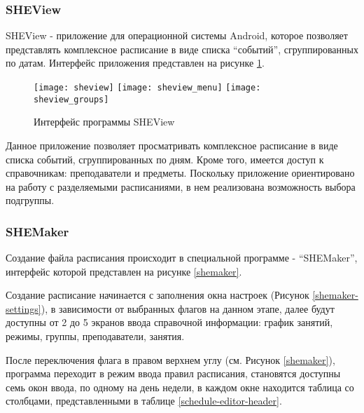 \subsubsection{SHEView}

SHEView - приложение для операционной системы Android, которое позволяет представлять комплексное расписание в виде списка “событий”, сгруппированных по датам.
Интерфейс приложения представлен на рисунке \ref{sheview}.

\begin{figure}[!htb]
      \texttt{[image: sheview]}
  \endminipage\hfill
      \texttt{[image: sheview\_menu]}
  \endminipage\hfill
      \texttt{[image: sheview\_groups]}
  \endminipage
  \caption{Интерфейс программы SHEView} \label{sheview}
\end{figure}

Данное приложение позволяет просматривать комплексное расписание в виде списка событий, сгруппированных по дням.
Кроме того, имеется доступ к справочникам: преподаватели и предметы.
Поскольку приложение ориентировано на работу с разделяемыми расписаниями, в нем реализована возможность выбора подгруппы.

\subsubsection{SHEMaker}

Создание файла расписания происходит в специальной программе - “SHEMaker”, интерфейс которой представлен на рисунке \ref{shemaker}.


Создание расписание начинается с заполнения окна настроек (Рисунок \ref{shemaker-settings}), в зависимости от выбранных флагов на данном этапе, далее будут доступны от 2 до 5 экранов ввода справочной информации: график занятий, режимы, группы, преподаватели, занятия.


После переключения флага в правом верхнем углу (см. Рисунок \ref{shemaker}), программа переходит в режим ввода правил расписания, становятся доступны семь окон ввода, по одному на день недели, в каждом окне находится таблица со столбцами, представленными в таблице \ref{schedule-editor-header}.

